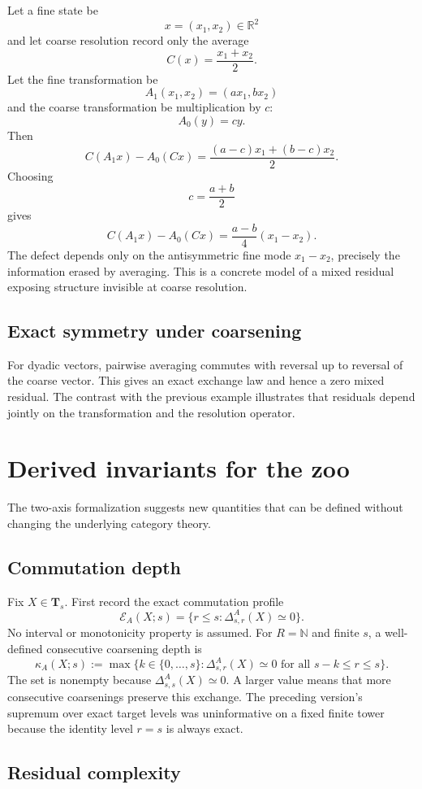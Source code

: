 \documentclass[11pt]{article}
\theoremstyle{definition}
\theoremstyle{remark}
\newcommand{\Tcat}{\mathbf T}
\begin{document}
Let a fine state be
\[
x=(x_1,x_2)\in\mathbb R^2
\]
and let coarse resolution record only the average
\[
C(x)=\frac{x_1+x_2}{2}.
\]
Let the fine transformation be
\[
A_1(x_1,x_2)=(ax_1,bx_2)
\]
and the coarse transformation be multiplication by $c$:
\[
A_0(y)=cy.
\]
Then
\[
C(A_1x)-A_0(Cx)
=
\frac{(a-c)x_1+(b-c)x_2}{2}.
\]
Choosing
\[
c=\frac{a+b}{2}
\]
gives
\[
C(A_1x)-A_0(Cx)
=
\frac{a-b}{4}(x_1-x_2).
\]
The defect depends only on the antisymmetric fine mode $x_1-x_2$, precisely the information erased by averaging. This is a concrete model of a mixed residual exposing structure invisible at coarse resolution.

\subsection{Exact symmetry under coarsening}

For dyadic vectors, pairwise averaging commutes with reversal up to reversal of the coarse vector. This gives an exact exchange law and hence a zero mixed residual. The contrast with the previous example illustrates that residuals depend jointly on the transformation and the resolution operator.

\section{Derived invariants for the zoo}

The two-axis formalization suggests new quantities that can be defined without changing the underlying category theory.

\subsection{Commutation depth}

Fix $X\in\Tcat_s$. First record the exact commutation profile
\[
\mathcal E_A(X;s)=\{r\le s:\Delta^A_{s,r}(X)\simeq0\}.
\]
No interval or monotonicity property is assumed. For $R=\mathbb N$ and finite $s$, a well-defined consecutive coarsening depth is
\[
\kappa_A(X;s):=\max\{k\in\{0,\ldots,s\}:\Delta^A_{s,r}(X)\simeq0
\text{ for all }s-k\le r\le s\}.
\]
The set is nonempty because $\Delta^A_{s,s}(X)\simeq0$. A larger value means that more consecutive coarsenings preserve this exchange. The preceding version's supremum over exact target levels was uninformative on a fixed finite tower because the identity level $r=s$ is always exact.

\subsection{Residual complexity}
\end{document}
